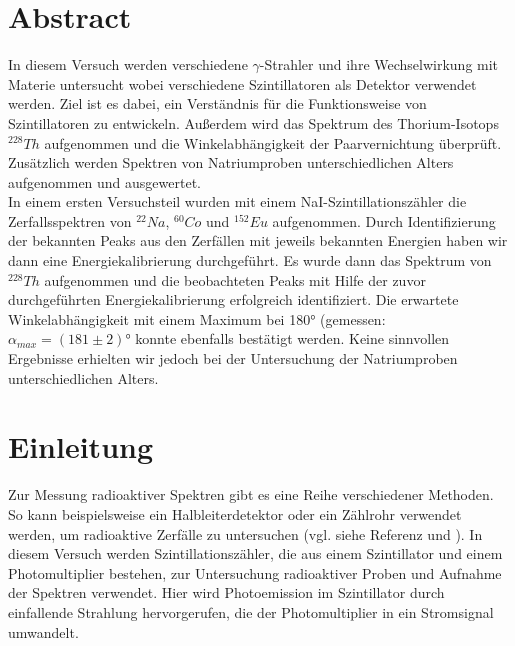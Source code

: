 \documentclass[12pt,listof=totoc]{scrartcl}
\title{\vspace{0cm}{\Huge Fortgeschrittenen-Praktikum I:\\ \vspace{1cm} Szintillationszähler}}
\author{Saskia Bondza\\Simon Stephan}
\date{durchgeführt am 12.10.2016 und 13.10.2016}
\begin{document}
\maketitle
\newpage

\section*{Abstract}

In diesem Versuch werden verschiedene $\gamma$-Strahler und ihre Wechselwirkung mit Materie untersucht wobei verschiedene Szintillatoren als Detektor verwendet werden. Ziel ist es dabei, ein Verständnis für die Funktionsweise von Szintillatoren zu entwickeln. Außerdem wird das Spektrum des Thorium-Isotops $^{228}Th$ aufgenommen  und die Winkelabhängigkeit der Paarvernichtung überprüft. Zusätzlich werden Spektren von Natriumproben unterschiedlichen Alters aufgenommen und ausgewertet.\\

In einem ersten Versuchsteil wurden mit einem NaI-Szintillationszähler die Zerfallsspektren von  $^{22}Na$, $^{60}Co$ und $^{152}Eu$ aufgenommen. Durch Identifizierung der bekannten Peaks aus den Zerfällen mit jeweils bekannten Energien haben wir dann eine Energiekalibrierung durchgeführt. Es wurde dann das Spektrum von $^{228}Th$ aufgenommen und die beobachteten Peaks mit Hilfe der zuvor durchgeführten Energiekalibrierung erfolgreich identifiziert. 
Die erwartete Winkelabhängigkeit mit einem Maximum bei 180° (gemessen: $\alpha_{max} = (181\pm 2)°$ konnte ebenfalls bestätigt werden.
Keine sinnvollen Ergebnisse erhielten wir jedoch bei der Untersuchung der Natriumproben unterschiedlichen Alters.

\newpage

\thispagestyle{empty}
\tableofcontents
\newpage

\section{Einleitung}



Zur Messung radioaktiver Spektren gibt es eine Reihe verschiedener Methoden. So kann beispielsweise ein Halbleiterdetektor oder ein Zählrohr verwendet werden, um radioaktive Zerfälle zu untersuchen (vgl. siehe Referenz \cite{staat} und \cite{staat1}). In diesem Versuch werden Szintillationszähler, die aus einem Szintillator und einem Photomultiplier bestehen, zur Untersuchung radioaktiver Proben und Aufnahme der Spektren verwendet. Hier wird Photoemission im Szintillator durch einfallende Strahlung hervorgerufen, die der Photomultiplier in ein Stromsignal umwandelt.
\end{document}
